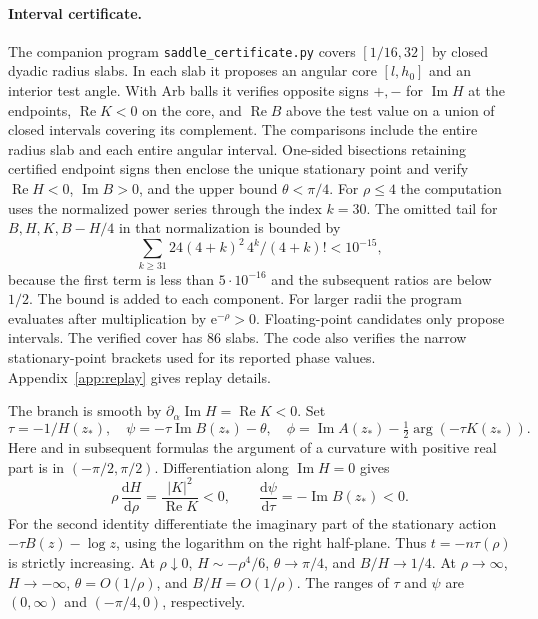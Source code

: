 \documentclass[11pt]{article}
\DeclareMathOperator{\Rea}{Re}
\DeclareMathOperator{\Ima}{Im}
\newcommand{\ee}{\mathrm e}
\newcommand{\dd}{\mathrm d}
\begin{document}
\paragraph{Interval certificate.}
The companion program \texttt{saddle\_certificate.py} covers \([1/16,32]\) by closed dyadic radius slabs. In each slab it proposes an angular core \([l,h_0]\) and an interior test angle. With Arb balls it verifies opposite signs \(+,-\) for \(\Ima H\) at the endpoints, \(\Rea K<0\) on the core, and \(\Rea B\) above the test value on a union of closed intervals covering its complement. The comparisons include the entire radius slab and each entire angular interval. One-sided bisections retaining certified endpoint signs then enclose the unique stationary point and verify \(\Rea H<0\), \(\Ima B>0\), and the upper bound \(\theta<\pi/4\). For \(\rho\le4\) the computation uses the normalized power series through the index \(k=30\). The omitted tail for \(B,H,K,B-H/4\) in that normalization is bounded by
\[
 \sum_{k\ge31}24(4+k)^2\,4^k/(4+k)!<10^{-15},
\]
because the first term is less than \(5\cdot10^{-16}\) and the subsequent ratios are below \(1/2\). The bound is added to each component. For larger radii the program evaluates after multiplication by \(\ee^{-\rho}>0\). Floating-point candidates only propose intervals. The verified cover has 86 slabs. The code also verifies the narrow stationary-point brackets used for its reported phase values. Appendix~\ref{app:replay} gives replay details.

The branch is smooth by \(\partial_\alpha\Ima H=\Rea K<0\). Set
\[
 \tau=-1/H(z_*),\quad
 \psi=-\tau\Ima B(z_*)-\theta,\quad
 \phi=\Ima A(z_*)-\tfrac12\arg(-\tau K(z_*)).
\]
Here and in subsequent formulas the argument of a curvature with positive real part is in \((-\pi/2,\pi/2)\). Differentiation along \(\Ima H=0\) gives
\[
 \rho\,\frac{\dd H}{\dd\rho}=\frac{|K|^2}{\Rea K}<0,\qquad
 \frac{\dd\psi}{\dd\tau}=-\Ima B(z_*)<0.
\]
For the second identity differentiate the imaginary part of the stationary action \(-\tau B(z)-\log z\), using the logarithm on the right half-plane. Thus \(t=-n\tau(\rho)\) is strictly increasing. At \(\rho\downarrow0\), \(H\sim-\rho^4/6\), \(\theta\to\pi/4\), and \(B/H\to1/4\). At \(\rho\to\infty\), \(H\to-\infty\), \(\theta=O(1/\rho)\), and \(B/H=O(1/\rho)\). The ranges of \(\tau\) and \(\psi\) are \((0,\infty)\) and \((-\pi/4,0)\), respectively.
\end{document}
